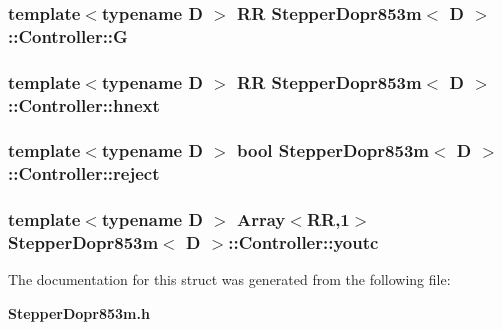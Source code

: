 \subsubsection[{\-G}]{\setlength{\rightskip}{0pt plus 5cm}template$<$typename D $>$ \-R\-R {\bf \-Stepper\-Dopr853m}$<$ \-D $>$\-::{\bf \-Controller\-::\-G}}\label{struct_stepper_dopr853m_1_1_controller_a3aac207df94ac5814d85d93bb55858a8}
\subsubsection[{hnext}]{\setlength{\rightskip}{0pt plus 5cm}template$<$typename D $>$ \-R\-R {\bf \-Stepper\-Dopr853m}$<$ \-D $>$\-::{\bf \-Controller\-::hnext}}\label{struct_stepper_dopr853m_1_1_controller_af0f5848a8041ebfa909c180249550737}
\subsubsection[{reject}]{\setlength{\rightskip}{0pt plus 5cm}template$<$typename D $>$ bool {\bf \-Stepper\-Dopr853m}$<$ \-D $>$\-::{\bf \-Controller\-::reject}}\label{struct_stepper_dopr853m_1_1_controller_ac39fbbb2bffec4027a00b3fd12cd4150}
\subsubsection[{youtc}]{\setlength{\rightskip}{0pt plus 5cm}template$<$typename D $>$ \-Array$<$\-R\-R,1$>$ {\bf \-Stepper\-Dopr853m}$<$ \-D $>$\-::{\bf \-Controller\-::youtc}}\label{struct_stepper_dopr853m_1_1_controller_a2cb2ec03c752f9cf2536632a9be9bd57}


\-The documentation for this struct was generated from the following file\-:\begin{DoxyCompactItemize}
\item 
{\bf \-Stepper\-Dopr853m.\-h}\end{DoxyCompactItemize}
